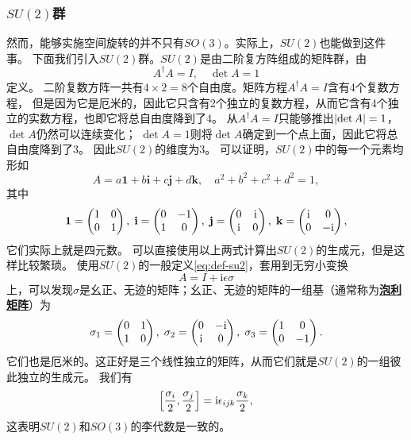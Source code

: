 \documentclass[hyperref, UTF8, a4paper]{ctexart}
\newcommand*{\ii}{\mathrm{i}}
\newcommand{\concept}[1]{\underline{\textbf{#1}}}
\begin{document}
\subsubsection{$SU(2)$群}

然而，能够实施空间旋转的并不只有$SO(3)$。实际上，$SU(2)$也能做到这件事。
下面我们引入$SU(2)$群。$SU(2)$是由二阶复方阵组成的矩阵群，由
\begin{equation}
    A^\dagger A = I, \quad \det A = 1
    \label{eq:def-su2}
\end{equation}
定义。
二阶复数方阵一共有$4 \times 2 = 8$个自由度。矩阵方程$A^\dagger A = I$含有4个复数方程，
但是因为它是厄米的，因此它只含有2个独立的复数方程，从而它含有4个独立的实数方程，也即它将总自由度降到了4。
从$A^\dagger A = I$只能够推出$\abs{\det A} = 1$，$\det A$仍然可以连续变化；
$\det A = 1$则将$\det A$确定到一个点上面，因此它将总自由度降到了3。
因此$SU(2)$的维度为3。
可以证明，$SU(2)$中的每一个元素均形如
\begin{equation}
    A = a \mathbf{1} + b \mathbf{i} + c \mathbf{j} + d \mathbf{k}, \quad a^2 + b^2 + c^2 + d^2 = 1,
    \label{eq:su2-expression}
\end{equation}
其中
\begin{equation}
    \mathbf{1} = \pmqty{1 & 0 \\ 0 & 1}, \; \mathbf{i} = \pmqty{0 & -1 \\ 1 & 0}, \; 
    \mathbf{j} = \pmqty{0 & \ii \\ \ii & 0}, \; \mathbf{k} = \pmqty{\ii & 0 \\ 0 & -\ii},
    \label{eq:quad-basis}
\end{equation}
它们实际上就是四元数。
可以直接使用以上两式计算出$SU(2)$的生成元，但是这样比较繁琐。
使用$SU(2)$的一般定义\eqref{eq:def-su2}，套用到无穷小变换
\[
    A = I + \ii \epsilon \sigma
\]
上，可以发现$\sigma$是幺正、无迹的矩阵；幺正、无迹的矩阵的一组基（通常称为\concept{泡利矩阵}）为
\begin{equation}
    \sigma_1 = \pmqty{0 & 1 \\ 1 & 0}, \; \sigma_2 = \pmqty{0 & -\ii \\ \ii & 0}, \; \sigma_3 = \pmqty{1 & 0 \\ 0 & -1}.
    \label{eq:sigma-matrix}
\end{equation}
它们也是厄米的。这正好是三个线性独立的矩阵，从而它们就是$SU(2)$的一组彼此独立的生成元。
我们有
\begin{equation}
    \comm{\frac{\sigma_i}{2}}{\frac{\sigma_j}{2}} = \ii \epsilon_{ijk} \frac{\sigma_k}{2},
\end{equation}
这表明$SU(2)$和$SO(3)$的李代数是一致的。
\end{document}

